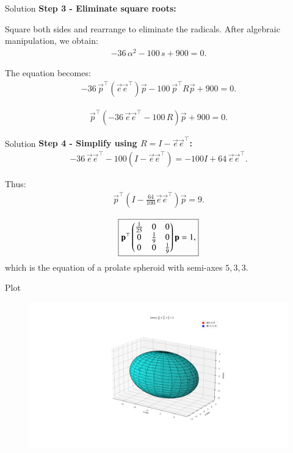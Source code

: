 \documentclass{beamer}
\begin{document}
\begin{frame}{Solution}
    \textbf{Step 3 - Eliminate square roots:}

Square both sides and rearrange to eliminate the radicals.
After algebraic manipulation, we obtain:
\begin{align}
-36\,\alpha^2 - 100\,s + 900 = 0.
\end{align}

The equation becomes:
\begin{align}
-36\,\vec{p}^\top (\vec{e}\vec{e}^\top) \vec{p}
- 100\,\vec{p}^\top R \vec{p}
+ 900 = 0.
\end{align}

\begin{align}
\vec{p}^\top\left(
-36\,\vec{e}\vec{e}^\top - 100\,R
\right)\vec{p} + 900 = 0.
\end{align}
\end{frame}

\begin{frame}{Solution}
    \textbf{Step 4 - Simplify using $R = I - \vec{e}\vec{e}^\top$:}
\begin{align}
-36\,\vec{e}\vec{e}^\top - 100(I - \vec{e}\vec{e}^\top)
= -100I + 64\,\vec{e}\vec{e}^\top.
\end{align}

Thus:
\begin{align}
\vec{p}^\top\left(
I - \frac{64}{100}\vec{e}\vec{e}^\top
\right)\vec{p} = 9.
\end{align}

\begin{align}
\boxed{
\mathbf{p}^\top
\begin{pmatrix}
\tfrac{1}{25} & 0 & 0 \\ 
0 & \tfrac{1}{9} & 0 \\ 
0 & 0 & \tfrac{1}{9}
\end{pmatrix}
\mathbf{p} = 1,
}
\end{align}
which is the equation of a prolate spheroid with semi-axes $5,3,3$.
\end{frame}

\begin{frame}{Plot}
    \begin{figure}
        \centering
        \includegraphics[width=1\linewidth]{figs/plot9.png}
        \caption{}
        \label{fig:placeholder}
    \end{figure}
\end{frame}
\end{document}

